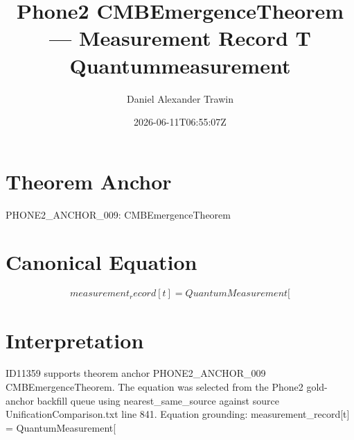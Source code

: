 \documentclass[11pt]{article}
\title{Phone2 CMBEmergenceTheorem — Measurement Record T Quantummeasurement}
\author{Daniel Alexander Trawin}
\date{2026-06-11T06:55:07Z}
\begin{document}
\maketitle
\section*{Theorem Anchor}
PHONE2_ANCHOR_009: CMBEmergenceTheorem
\section*{Canonical Equation}
\[
measurement_record[t] = QuantumMeasurement[
\]
\section*{Interpretation}
ID11359 supports theorem anchor PHONE2_ANCHOR_009 CMBEmergenceTheorem. The equation was selected from the Phone2 gold-anchor backfill queue using nearest_same_source against source UnificationComparison.txt line 841. Equation grounding: measurement_record[t] = QuantumMeasurement[
\end{document}
